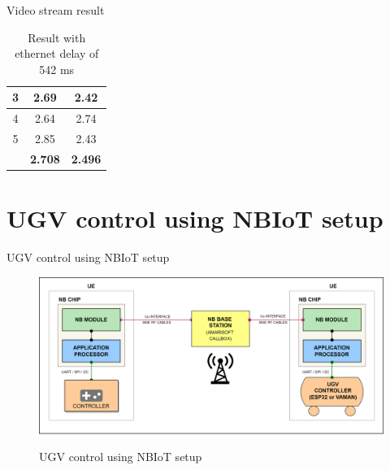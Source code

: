 \documentclass[xcolor=table]{beamer}
\begin{document}
\begin{frame}{Video stream result}
\begin{table}[]
{\begin{tabular}{|c|c|c|}
3                                                              & 2.69                                                                                                                                                & 2.42                                                                                                                                            \\ \hline
4                                                              & 2.64                                                                                                                                                & 2.74                                                                                                                                            \\ \hline
5                                                              & 2.85                                                                                                                                                & 2.43                                                                                                                                            \\ \hline
\rowcolor[HTML]{DBDBEB} 
\multicolumn{1}{|l|}{\cellcolor[HTML]{E4E4EF}\textbf{Average}} & \textbf{2.708}                                                                                                                                      & \textbf{2.496}                                                                                                                                  \\ \hline
\end{tabular}
}
\caption{Result with ethernet delay of 542 ms}
\end{table}
\end{frame}


\section{UGV control using NBIoT setup}
\begin{frame}{UGV control using NBIoT setup}
\begin{figure}[h!]
  		\centering
  		\includegraphics[width=\linewidth]{./figs/NBIoT_setup.png}
  		\label{NBIoT_setup}
  		\caption{UGV control using NBIoT setup}
\end{figure}

\end{frame}
\end{document}
